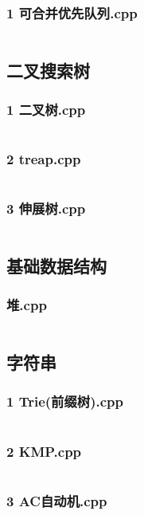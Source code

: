 \documentclass[a4paper,11pt]{article}
\begin{document}
\subsubsection{1 可合并优先队列.cpp}
\inputminted{c++}{"D:/tmplz/templates/数据结构/pbds/1 可合并优先队列.cpp"}
\subsection{二叉搜索树}
\subsubsection{1 二叉树.cpp}
\inputminted{c++}{"D:/tmplz/templates/数据结构/二叉搜索树/1 二叉树.cpp"}
\subsubsection{2 treap.cpp}
\inputminted{c++}{"D:/tmplz/templates/数据结构/二叉搜索树/2 treap.cpp"}
\subsubsection{3 伸展树.cpp}
\inputminted{c++}{"D:/tmplz/templates/数据结构/二叉搜索树/3 伸展树.cpp"}
\subsection{基础数据结构}
\subsubsection{堆.cpp}
\inputminted{c++}{"D:/tmplz/templates/数据结构/基础数据结构/堆.cpp"}
\subsection{字符串}
\subsubsection{1 Trie(前缀树).cpp}
\inputminted{c++}{"D:/tmplz/templates/数据结构/字符串/1 Trie(前缀树).cpp"}
\subsubsection{2 KMP.cpp}
\inputminted{c++}{"D:/tmplz/templates/数据结构/字符串/2 KMP.cpp"}
\subsubsection{3 AC自动机.cpp}
\inputminted{c++}{"D:/tmplz/templates/数据结构/字符串/3 AC自动机.cpp"}
\end{document}
